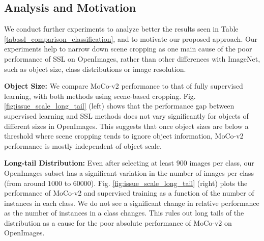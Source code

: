 \subsection{Analysis and Motivation}
We conduct further experiments to analyze better the results seen in Table \ref{tab:ssl_comparison_classification}, and to motivate our proposed approach. Our experiments help to narrow down scene cropping as one main cause of the poor performance of SSL on OpenImages, rather than other differences with ImageNet, such as object size, class distributions or image resolution.


\textbf{Object Size:} We compare MoCo-v2 performance to that of fully supervised learning, with both methods using scene-based cropping. Fig. \ref{fig:issue_scale_long_tail} (left) shows that the performance gap between supervised learning and SSL methods does not vary significantly for objects of different sizes in OpenImages. This suggests that once object sizes are below a threshold where scene cropping tends to ignore object information, MoCo-v2 performance is mostly independent of object scale. 

\textbf{Long-tail Distribution:} Even after selecting at least $900$ images per class, our OpenImages subset has a significant variation in the number of images per class (from around $1000$ to $60000$). Fig. \ref{fig:issue_scale_long_tail} (right) plots the performance of MoCo-v2 and supervised training as a function of the number of instances in each class. We do not see a significant change in relative performance as the number of instances in a class changes. This rules out long tails of the distribution as a cause for the poor absolute performance of MoCo-v2 on OpenImages.

